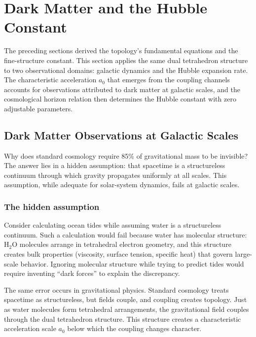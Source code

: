 \documentclass[aps,prd,preprint,superscriptaddress,showpacs,preprintnumbers,amsmath,amssymb,nofootinbib]{revtex4-2}
\begin{document}
\section{Dark Matter and the Hubble Constant}
\label{sec:darkmatter}

The preceding sections derived the topology's fundamental equations and the fine-structure constant. This section applies the same dual tetrahedron structure to two observational domains: galactic dynamics and the Hubble expansion rate. The characteristic acceleration $a_0$ that emerges from the coupling channels accounts for observations attributed to dark matter at galactic scales, and the cosmological horizon relation then determines the Hubble constant with zero adjustable parameters.

\subsection{Dark Matter Observations at Galactic Scales}
\label{subsec:darkmatter}

Why does standard cosmology require 85\% of gravitational mass to be invisible? The answer lies in a hidden assumption: that spacetime is a structureless continuum through which gravity propagates uniformly at all scales. This assumption, while adequate for solar-system dynamics, fails at galactic scales.

\subsubsection*{The hidden assumption}

Consider calculating ocean tides while assuming water is a structureless continuum. Such a calculation would fail because water has molecular structure: $\text{H}_2\text{O}$ molecules arrange in tetrahedral electron geometry, and this structure creates bulk properties (viscosity, surface tension, specific heat) that govern large-scale behavior. Ignoring molecular structure while trying to predict tides would require inventing ``dark forces'' to explain the discrepancy.

The same error occurs in gravitational physics. Standard cosmology treats spacetime as structureless, but fields couple, and coupling creates topology. Just as water molecules form tetrahedral arrangements, the gravitational field couples through the dual tetrahedron structure. This structure creates a characteristic acceleration scale $a_0$ below which the coupling changes character.
\end{document}
